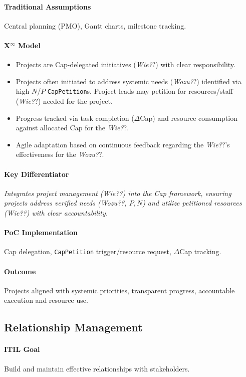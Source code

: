 \documentclass[12pt, a4paper]{scrartcl}
\newcommand{\Xinf}{X$^\infty$}                        %
\newcommand{\DeltaCap}{$\Delta$Cap}                    %
\newcommand{\CapPetition}{\texttt{CapPetition}}        %
\newcommand{\Wozu}{\textit{Wozu?}}                      %
\newcommand{\Wie}{\textit{Wie?}}                        %
\begin{document}
\paragraph{Traditional Assumptions} Central planning (PMO), Gantt charts, milestone tracking.
\paragraph*{\Xinf{} Model}
\begin{itemize}
    \item Projects are Cap-delegated initiatives (\Wie?) with clear responsibility.
    \item Projects often initiated to address systemic needs (\Wozu?) identified via high $N$/$P$ \CapPetition{}s. Project leads may petition for resources/staff (\Wie?) needed for the project.
    \item Progress tracked via task completion (\DeltaCap{}) and resource consumption against allocated Cap for the \Wie?.
    \item Agile adaptation based on continuous feedback regarding the \Wie?'s effectiveness for the \Wozu?.
\end{itemize}
\paragraph{Key Differentiator} \textit{Integrates project management (\Wie?) into the Cap framework, ensuring projects address verified needs (\Wozu?, $P,N$) and utilize petitioned resources (\Wie?) with clear accountability.}
\paragraph{PoC Implementation} Cap delegation, \CapPetition{} trigger/resource request, \DeltaCap{} tracking.
\paragraph{Outcome} Projects aligned with systemic priorities, transparent progress, accountable execution and resource use.

\subsection{Relationship Management} %
\paragraph{ITIL Goal} Build and maintain effective relationships with stakeholders.
\end{document}
